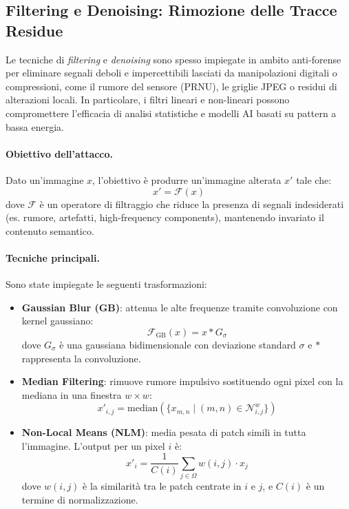 \subsection{Filtering e Denoising: Rimozione delle Tracce Residue}
\label{sec:filtering_denoising}

Le tecniche di \textit{filtering} e \textit{denoising} sono spesso impiegate in ambito anti-forense per eliminare segnali deboli e impercettibili lasciati da manipolazioni digitali o compressioni, come il rumore del sensore (PRNU), le griglie JPEG o residui di alterazioni locali. In particolare, i filtri lineari e non-lineari possono compromettere l’efficacia di analisi statistiche e modelli AI basati su pattern a bassa energia.

\paragraph{Obiettivo dell’attacco.}
Dato un’immagine $x$, l’obiettivo è produrre un’immagine alterata $x'$ tale che:
\[
x' = \mathcal{F}(x)
\]
dove $\mathcal{F}$ è un operatore di filtraggio che riduce la presenza di segnali indesiderati (es. rumore, artefatti, high-frequency components), mantenendo invariato il contenuto semantico.

\paragraph{Tecniche principali.}
Sono state impiegate le seguenti trasformazioni:

\begin{itemize}
    \item \textbf{Gaussian Blur (GB)}: attenua le alte frequenze tramite convoluzione con kernel gaussiano:
    \[
    \mathcal{F}_{\text{GB}}(x) = x * G_{\sigma}
    \]
    dove $G_{\sigma}$ è una gaussiana bidimensionale con deviazione standard $\sigma$ e $*$ rappresenta la convoluzione.

    \item \textbf{Median Filtering}: rimuove rumore impulsivo sostituendo ogni pixel con la mediana in una finestra $w \times w$:
    \[
    x'_{i,j} = \text{median}\left( \{ x_{m,n} \mid (m,n) \in \mathcal{N}_{i,j}^{w} \} \right)
    \]

    \item \textbf{Non-Local Means (NLM)}: media pesata di patch simili in tutta l’immagine. L’output per un pixel $i$ è:
    \[
    x'_i = \frac{1}{C(i)} \sum_{j \in \Omega} w(i,j) \cdot x_j
    \]
    dove $w(i,j)$ è la similarità tra le patch centrate in $i$ e $j$, e $C(i)$ è un termine di normalizzazione.
\end{itemize}

